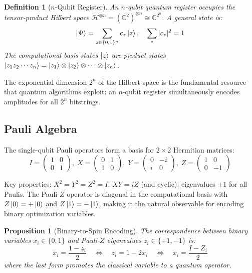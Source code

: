 \documentclass[11pt]{article}
\newcommand{\C}{\mathbb{C}}
\newcommand{\Hilbert}{\mathcal{H}}
\newtheorem{proposition}[theorem]{Proposition}
\newtheorem{definition}{Definition}
\begin{document}
\begin{definition}[$n$-Qubit Register]
An $n$-qubit quantum register occupies the tensor-product Hilbert space $\Hilbert^{\otimes n} = (\C^2)^{\otimes n} \cong \C^{2^n}$. A general state is:
\begin{equation}
\ket{\Psi} = \sum_{z \in \{0,1\}^n} c_z \ket{z}, \quad \sum_{z} |c_z|^2 = 1
\end{equation}
The computational basis states $\ket{z}$ are product states $\ket{z_1 z_2 \cdots z_n} = \ket{z_1}\otimes\ket{z_2}\otimes\cdots\otimes\ket{z_n}$.
\end{definition}

The exponential dimension $2^n$ of the Hilbert space is the fundamental resource that quantum algorithms exploit: an $n$-qubit register simultaneously encodes amplitudes for all $2^n$ bitstrings.

\subsection{Pauli Algebra}

The single-qubit Pauli operators form a basis for $2\times 2$ Hermitian matrices:
\begin{equation}
I = \begin{pmatrix} 1 & 0 \\ 0 & 1 \end{pmatrix},\;
X = \begin{pmatrix} 0 & 1 \\ 1 & 0 \end{pmatrix},\;
Y = \begin{pmatrix} 0 & -i \\ i & 0 \end{pmatrix},\;
Z = \begin{pmatrix} 1 & 0 \\ 0 & -1 \end{pmatrix}
\label{eq:paulis}
\end{equation}

Key properties: $X^2 = Y^2 = Z^2 = I$; $XY = iZ$ (and cyclic); eigenvalues $\pm 1$ for all Paulis. The Pauli-$Z$ operator is diagonal in the computational basis with $Z\ket{0} = +\ket{0}$ and $Z\ket{1} = -\ket{1}$, making it the natural observable for encoding binary optimization variables.

\begin{proposition}[Binary-to-Spin Encoding]
\label{prop:binary_spin}
The correspondence between binary variables $x_i \in \{0,1\}$ and Pauli-$Z$ eigenvalues $z_i \in \{+1,-1\}$ is:
\begin{equation}
x_i = \frac{1 - z_i}{2} \quad \Leftrightarrow \quad z_i = 1 - 2x_i \quad \Leftrightarrow \quad x_i = \frac{I - Z_i}{2}
\label{eq:binary_spin}
\end{equation}
where the last form promotes the classical variable to a quantum operator.
\end{proposition}
\end{document}

